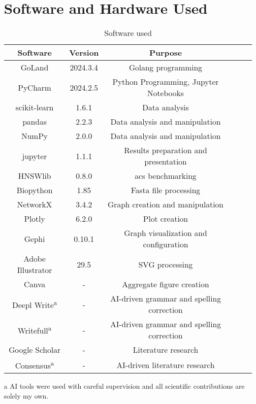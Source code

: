 \section{Software and Hardware Used}
 \begin{table}[ht!]
    \caption{Software used}
    \label{table:software}
        \begin{threeparttable}
            \begin{tabular}{Sc|Sc|Sc}
                Software & Version & Purpose \\
                \hline\hline
                GoLand & 2024.3.4 & Golang programming \\
                \hline
                PyCharm & 2024.2.5 & Python Programming, Jupyter Notebooks \\
                \hline
                scikit-learn & 1.6.1 & Data analysis \\
                \hline
                pandas & 2.2.3 & Data analysis and manipulation \\
                \hline
                NumPy & 2.0.0 & Data analysis and manipulation \\
                \hline
                jupyter & 1.1.1 & Results preparation and presentation \\
                \hline
                HNSWlib & 0.8.0 & \acrshort{acs} benchmarking \\
                \hline
                Biopython & 1.85 & Fasta file processing \\
                \hline
                NetworkX & 3.4.2 & Graph creation and manipulation \\
                \hline
                Plotly & 6.2.0 & Plot creation \\
                \hline
                Gephi & 0.10.1 & Graph visualization and configuration \\
                \hline
                Adobe Illustrator & 29.5 & SVG processing \\
                \hline
                Canva & - & Aggregate figure creation \\
                \hline
                Deepl Write\textsuperscript{a} & - & AI-driven grammar and spelling correction \\
                \hline
                Writefull\textsuperscript{a} & - & AI-driven grammar and spelling correction \\
                \hline
                Google Scholar & - & Literature research \\
                \hline
                Consensus\textsuperscript{a} & - & AI-driven literature research \\
            \end{tabular}
            \begin{tablenotes}[flushleft]
                \small
                \item[a] AI tools were used with careful supervision and all scientific contributions are solely my own.
            \end{tablenotes}
        \end{threeparttable}
\end{table}

